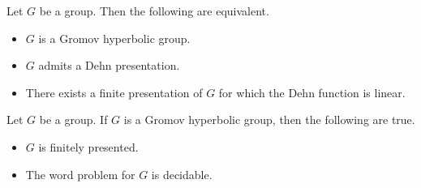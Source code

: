 \documentclass[a4paper]{article}
\begin{document}
\begin{thm}{}{} Let $G$ be a group. Then the following are equivalent. 
\begin{itemize}
\item $G$ is a Gromov hyperbolic group. 
\item $G$ admits a Dehn presentation. 
\item There exists a finite presentation of $G$ for which the Dehn function is linear. 
\end{itemize}
\end{thm}

\begin{crl}{}{} Let $G$ be a group. If $G$ is a Gromov hyperbolic group, then the following are true. 
\begin{itemize}
\item $G$ is finitely presented. 
\item The word problem for $G$ is decidable. 
\end{itemize}
\end{crl}
\end{document}
